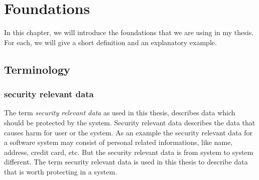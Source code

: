 
\chapter{Foundations}
\label{ch:basiscs}
In this chapter, we will introduce the foundations that we are using in my thesis. For each, we will give a short definition and an explanatory example.
\section{Terminology}
\subsection{security relevant data}
The term \textit{security relevant data} as used in this thesis, describes data which should be protected by the system. Security relevant data describes the data that causes harm for user or the system. As an example the security relevant data for a software system may consist of personal related informations, like name, address, credit card, etc. But the security relevant data is from system to system different. The term security relevant data is used in this thesis to describe data that is worth protecting in a system. 
